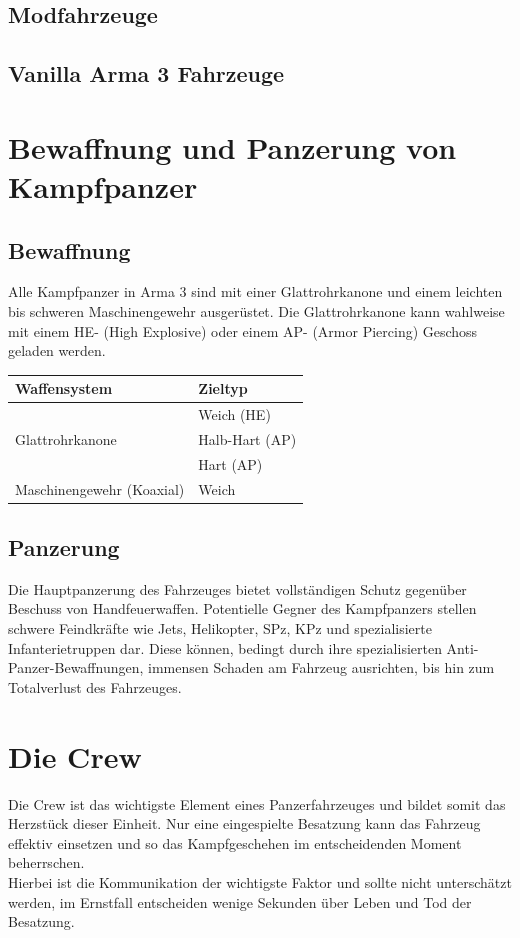\subsection{Modfahrzeuge}
\subsection{Vanilla Arma 3 Fahrzeuge}

\section{Bewaffnung und Panzerung von Kampfpanzer}
\subsection{Bewaffnung}
	Alle Kampfpanzer in Arma 3 sind mit einer Glattrohrkanone und einem leichten bis schweren Maschinengewehr ausgerüstet. Die Glattrohrkanone kann wahlweise mit einem HE- (High Explosive) oder einem AP- (Armor Piercing) Geschoss geladen werden.
	\begin{longtable}{ll} 
		\toprule
		Waffensystem & Zieltyp\\
		\midrule
		\multirow{3}{*}{Glattrohrkanone} & Weich (HE)\\
		& Halb-Hart (AP)\\
		& Hart (AP)\\
		Maschinengewehr (Koaxial) & Weich\\
		\bottomrule 
	\end{longtable}

\subsection{Panzerung}
	Die Hauptpanzerung des Fahrzeuges bietet vollständigen Schutz gegenüber Beschuss von Handfeuerwaffen. Potentielle Gegner des Kampfpanzers stellen schwere Feindkräfte wie Jets, Helikopter, SPz, KPz und spezialisierte Infanterietruppen dar. Diese können, bedingt durch ihre spezialisierten Anti-Panzer-Bewaffnungen, immensen Schaden am Fahrzeug ausrichten, bis hin zum Totalverlust des Fahrzeuges. 

\section{Die Crew}
\label{sec:panzercrew}
	Die Crew ist das wichtigste Element eines Panzerfahrzeuges und bildet somit das Herzstück dieser Einheit. Nur eine eingespielte Besatzung kann das Fahrzeug effektiv einsetzen und so das Kampfgeschehen im entscheidenden Moment beherrschen.\\
	Hierbei ist die Kommunikation der wichtigste Faktor und sollte nicht unterschätzt werden, im Ernstfall entscheiden wenige Sekunden über Leben und Tod der Besatzung.\\

